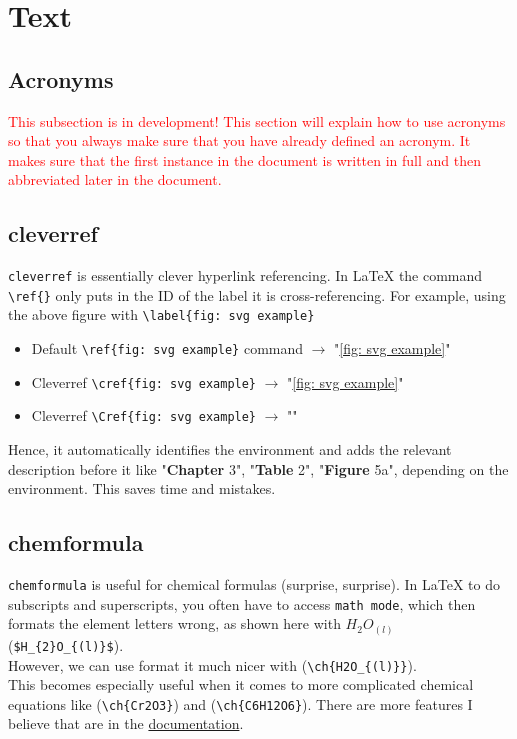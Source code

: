 \section{Text}
\subsection{Acronyms}
\textcolor{red}{This subsection is in development! This section will explain how to use acronyms so that you always make sure that you have already defined an acronym. It makes sure that the first instance in the document is written in full and then abbreviated later in the document.}
\subsection{cleverref}
\texttt{cleverref} is essentially clever hyperlink referencing. In \LaTeX{} the command \verb|\ref{}| only puts in the ID of the label it is cross-referencing. For example, using the above figure with \verb|\label{fig: svg example}|
\begin{itemize}[noitemsep]
    \item Default \verb|\ref{fig: svg example}| command $\rightarrow$ "\ref{fig: svg example}"
    \item Cleverref \verb|\cref{fig: svg example}| $\rightarrow$ "\cref{fig: svg example}"
    \item Cleverref \verb|\Cref{fig: svg example}| $\rightarrow$ ""
\end{itemize}
Hence, it automatically identifies the environment and adds the relevant description before it like "\textbf{Chapter} 3", "\textbf{Table} 2", "\textbf{Figure} 5a", depending on the environment. This saves time and mistakes.

\subsection{chemformula}
\texttt{chemformula} is useful for chemical formulas (surprise, surprise). In \LaTeX{} to do subscripts and superscripts, you often have to access \texttt{math mode}, which then formats the element letters wrong, as shown here with $H_{2}O_{(l)}$ (\verb|$H_{2}O_{(l)}$|).\\
However, we can use format it much nicer with  (\verb|\ch{H2O_{(l)}}|).\\
This becomes especially useful when it comes to more complicated chemical equations like  (\verb|\ch{Cr2O3}|) and  (\verb|\ch{C6H12O6}|).
There are more features I believe that are in the \href{https://ctan.org/pkg/chemformula?lang=en}{documentation}.


